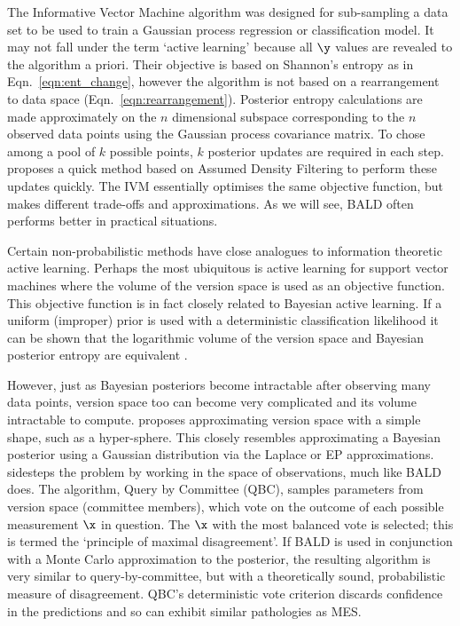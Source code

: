 The Informative Vector Machine \citep[IVM,][]{Lawrence2004} algorithm was designed for sub-sampling a data set to be used to train a Gaussian process regression or classification model. It may not fall under the term `active learning' because all $\y$ values are revealed to the algorithm a priori. Their objective is based on Shannon's entropy as in Eqn.\ \eqref{eqn:ent_change}, however the algorithm is not based on a rearrangement to data space (Eqn.\ \eqref{eqn:rearrangement}). Posterior entropy calculations are made approximately on the $n$ dimensional subspace corresponding to the $n$ observed data points using the Gaussian process covariance matrix. To chose among a pool of $k$ possible points, $k$ posterior updates are required in each step. \citep{Lawrence2004} proposes a quick method based on Assumed Density Filtering to perform these updates quickly. The IVM essentially optimises the same objective function, but makes different trade-offs and approximations. As we will see, BALD often performs better in practical situations.

Certain non-probabilistic methods have close analogues to information theoretic active learning. Perhaps the most ubiquitous is active learning for support vector machines \citep[SVM,][]{Tong2002,seung1992} where the volume of the version space is used as an objective function. This objective function is in fact closely related to Bayesian active learning. If a uniform (improper) prior is used with a deterministic classification likelihood it can be shown that the logarithmic volume of the version space and Bayesian posterior entropy are equivalent \citep{Freund1997}.

However, just as Bayesian posteriors become intractable after observing many data points, version space too can become very complicated and its volume intractable to compute. \citep{Tong2002} proposes approximating version space with a simple shape, such as a hyper-sphere. This closely resembles approximating a Bayesian posterior using a Gaussian distribution via the Laplace or EP approximations. \citep{seung1992} sidesteps the problem by working in the space of observations, much like BALD does. The algorithm, Query by Committee (QBC), samples parameters from version space (committee members), which vote on the outcome of each possible measurement $\x$ in question. The $\x$ with the most balanced vote is selected; this is termed the `principle of maximal disagreement'. If BALD is used in conjunction with a Monte Carlo approximation to the posterior, the resulting algorithm is very similar to query-by-committee, but with a theoretically sound, probabilistic measure of disagreement. QBC's deterministic vote criterion discards confidence in the predictions and so can exhibit similar pathologies as MES.

